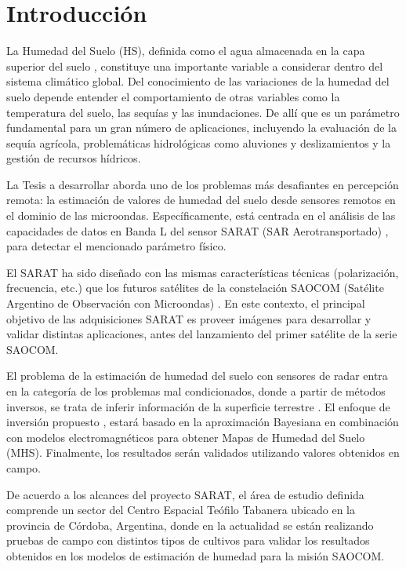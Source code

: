 \section*{Introducción}
\label{sec:intro}

La Humedad del Suelo (HS), definida como el agua almacenada en la capa superior del suelo \cite{Behari2005}, constituye una importante variable a considerar dentro del sistema climático global. Del conocimiento de las variaciones de la humedad del suelo depende entender el comportamiento de otras variables como la temperatura del suelo, las sequías y las inundaciones. De allí que es un parámetro fundamental para un gran número de aplicaciones, incluyendo la evaluación de la sequía agrícola, problemáticas hidrológicas como aluviones y deslizamientos y la gestión de recursos hídricos\cite{Barrett2009}.

La Tesis a desarrollar aborda uno de los problemas más desafiantes en percepción remota: la estimación de valores de humedad del suelo desde sensores remotos en el dominio de las microondas. Específicamente, está centrada en el análisis de las capacidades de datos en Banda L del sensor SARAT (SAR Aerotransportado) \cite{sarat}, para detectar el mencionado parámetro físico. 

El SARAT ha sido diseñado con las mismas características técnicas (polarización, frecuencia, etc.) que los futuros satélites de la constelación SAOCOM (Satélite Argentino de Observación con Microondas) \cite{saocom}. En este contexto, el principal objetivo de las adquisiciones SARAT es proveer imágenes para desarrollar y validar distintas aplicaciones, antes del lanzamiento del primer satélite de la serie SAOCOM. 

El problema de la estimación de humedad del suelo con sensores de radar entra en la categoría de los problemas mal condicionados, donde a partir de métodos inversos, se trata de inferir información de la superficie terrestre \cite{DyU1998Chapter8}. El enfoque de inversión propuesto \cite{Notarnicola2008,Notarnicola2004}, estará basado en la aproximación Bayesiana en combinación con modelos electromagnéticos para obtener Mapas de Humedad del Suelo (MHS). Finalmente, los resultados serán validados utilizando valores obtenidos en campo.

De acuerdo a los alcances del proyecto SARAT, el área de estudio definida comprende un sector del Centro Espacial Teófilo Tabanera ubicado en la provincia de Córdoba, Argentina, donde en la actualidad se están realizando pruebas de campo con distintos tipos de cultivos para validar los resultados obtenidos en los modelos de estimación de humedad para la misión SAOCOM.\\
\vspace*{0.2cm}

